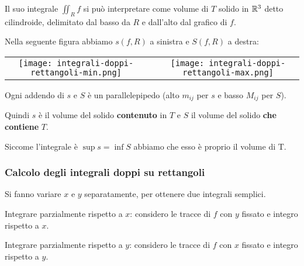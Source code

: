 Il suo integrale \(\iint_R f\) si può interpretare come volume di \(T\) solido in \(\mathbb{R}^{3}\) detto cilindroide, delimitato dal basso da \(R\) e dall'alto dal grafico di \(f\).

Nella seguente figura abbiamo \(s(f,R)\) a sinistra e \(S(f,R)\) a destra:

\begin{center}
    \begin{tabular}{c c c}
        \texttt{[image: integrali-doppi-rettangoli-min.png]}
         &
        \hspace{3mm}
         &
        \texttt{[image: integrali-doppi-rettangoli-max.png]}
    \end{tabular}
\end{center}

Ogni addendo di \(s\) e \(S\) è un parallelepipedo (alto \(m_{ij}\) per \(s\) e basso \(M_{ij}\) per \(S\)).

Quindi \(s\) è il volume del solido \textbf{contenuto} in \(T\) e \(S\) il volume del solido \textbf{che contiene} \(T\).

Siccome l'integrale è \(\sup s = \inf S\) abbiamo che esso è proprio il volume di T.

\filbreak{}
\subsubsection{Calcolo degli integrali doppi su rettangoli}

Si fanno variare \(x\) e \(y\) separatamente, per ottenere due integrali semplici.

Integrare parzialmente rispetto a \(x\): considero le tracce di \(f\) con \(y\) fissato e integro rispetto a \(x\).

Integrare parzialmente rispetto a \(y\): considero le tracce di \(f\) con \(x\) fissato e integro rispetto a \(y\).

